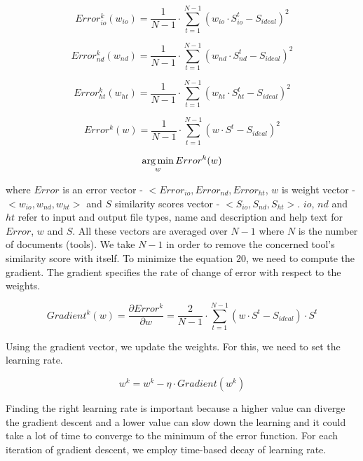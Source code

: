 \begin{equation}
Error^k_{io}(w_{io}) = \frac{1}{N - 1} \cdot \sum_{t=1}^{N-1} (w_{io} \cdot S^t_{io} - S_{ideal}) ^ 2
\end{equation}

\begin{equation}
Error^k_{nd}(w_{nd}) = \frac{1}{N - 1} \cdot \sum_{t=1}^{N-1} (w_{nd} \cdot S^t_{nd} - S_{ideal}) ^ 2
\end{equation}

\begin{equation}
Error^k_{ht}(w_{ht}) =  \frac{1}{N - 1} \cdot \sum_{t=1}^{N-1} (w_{ht} \cdot S^t_{ht} - S_{ideal}) ^ 2
\end{equation}

\begin{equation}
Error^k(w) =  \frac{1}{N - 1} \cdot \sum_{t=1}^{N-1} (w \cdot S^t - S_{ideal}) ^ 2
\end{equation}

\begin{equation}
\operatorname*{arg\,min}_w Error^k(w) 
\end{equation} 

where $Error$ is an error vector - $<Error_{io}, Error_{nd}, Error_{ht}$, $w$ is weight vector - $<w_{io}, w_{nd}, w_{ht}>$ and $S$ similarity scores vector - $<S_{io}, S_{nd}, S_{ht}>$. $io$, $nd$ and $ht$ refer to input and output file types, name and description and help text for $Error$, $w$ and $S$. All these vectors are averaged over $N-1$ where $N$ is the number of documents (tools). We take $N-1$ in order to remove the concerned tool's similarity score with itself. To minimize the equation $20$, we need to compute the gradient. The gradient specifies the rate of change of error with respect to the weights.

\begin{equation}
Gradient^k(w) = \frac{\partial Error^k}{\partial w} =  \frac{2}{N - 1} \cdot \sum_{t=1}^{N-1} (w \cdot S^t - S_{ideal}) \cdot S^t
\end{equation}

Using the gradient vector, we update the weights. For this, we need to set the learning rate.

\begin{equation}
w^k = w^k - \eta \cdot {Gradient(w^k)}
\end{equation}

Finding the right learning rate is important because a higher value can diverge the gradient descent and a lower value can slow down the learning and it could take a lot of time to converge to the minimum of the error function. For each iteration of gradient descent, we employ time-based decay of learning rate.


